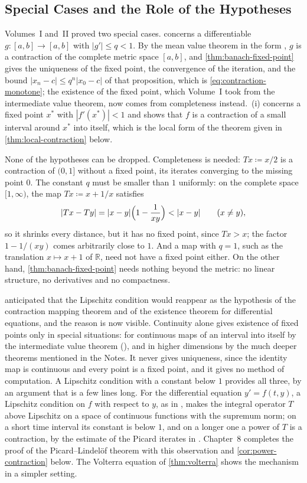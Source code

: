 \subsection{Special Cases and the Role of the Hypotheses}

Volumes~I and~II proved two special cases.  concerns a differentiable $g\colon[a,b]\to[a,b]$ with $|g'|\le q<1$. By the mean value theorem in the form , $g$ is a contraction of the complete metric space $[a,b]$, and \cref{thm:banach-fixed-point} gives the uniqueness of the fixed point, the convergence of the iteration, and the bound $|x_n-c|\le q^n|x_0-c|$ of that proposition, which is \eqref{eq:contraction-monotone}; the existence of the fixed point, which Volume~I took from the intermediate value theorem, now comes from completeness instead. \,(i) concerns a fixed point $x^*$ with $|f'(x^*)|<1$ and shows that $f$ is a contraction of a small interval around $x^*$ into itself, which is the local form of the theorem given in \cref{thm:local-contraction} below.

None of the hypotheses can be dropped. Completeness is needed: $Tx\coloneqq x/2$ is a contraction of $(0,1]$ without a fixed point, its iterates converging to the missing point $0$. The constant $q$ must be smaller than $1$ uniformly: on the complete space $[1,\infty)$, the map $Tx\coloneqq x+1/x$ satisfies
\[
|Tx-Ty|=|x-y|\Bigl(1-\frac1{xy}\Bigr)<|x-y|\qquad(x\ne y),
\]
so it shrinks every distance, but it has no fixed point, since $Tx>x$; the factor $1-1/(xy)$ comes arbitrarily close to $1$. And a map with $q=1$, such as the translation $x\mapsto x+1$ of $\mathbb R$, need not have a fixed point either. On the other hand, \cref{thm:banach-fixed-point} needs nothing beyond the metric: no linear structure, no derivatives and no compactness.

 anticipated that the Lipschitz condition would reappear as the hypothesis of the contraction mapping theorem and of the existence theorem for differential equations, and the reason is now visible. Continuity alone gives existence of fixed points only in special situations: for continuous maps of an interval into itself by the intermediate value theorem (), and in higher dimensions by the much deeper theorems mentioned in the Notes. It never gives uniqueness, since the identity map is continuous and every point is a fixed point, and it gives no method of computation. A Lipschitz condition with a constant below $1$ provides all three, by an argument that is a few lines long. For the differential equation $y'=f(t,y)$, a Lipschitz condition on $f$ with respect to $y$, as in , makes the integral operator $T$ above Lipschitz on a space of continuous functions with the supremum norm; on a short time interval its constant is below $1$, and on a longer one a power of $T$ is a contraction, by the estimate of the Picard iterates in . Chapter~8 completes the proof of the Picard--Lindel\"of theorem with this observation and \cref{cor:power-contraction} below. The Volterra equation of \cref{thm:volterra} shows the mechanism in a simpler setting.

